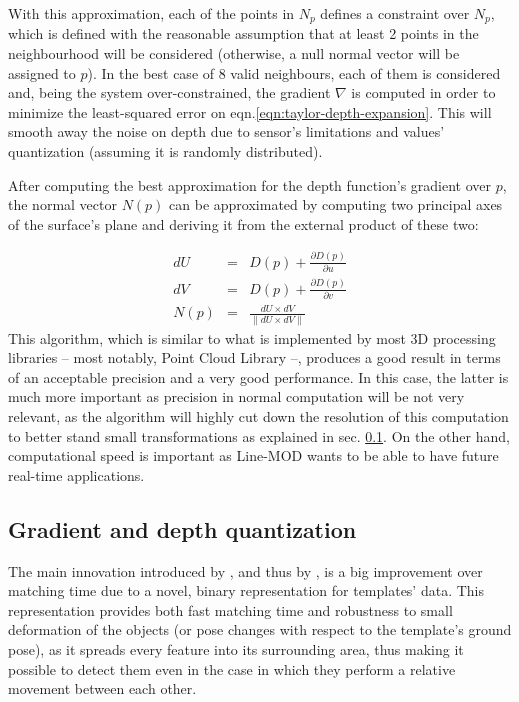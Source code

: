 With this approximation, each of the points in $N_p$ defines a
constraint over $N_p$, which is defined with the reasonable assumption
that at least 2 points in the neighbourhood will be considered
(otherwise, a null normal vector will be assigned to $p$). In the best
case of 8 valid neighbours, each of them is considered and, being the
system over-constrained, the
gradient $\nabla$ is computed in order to minimize the least-squared
error on eqn.\ref{eqn:taylor-depth-expansion}. This will smooth away
the noise on depth due to sensor's limitations and values'
quantization (assuming it is randomly distributed).

After computing the best approximation for the depth function's
gradient over $p$, the normal vector $N(p)$ can be approximated by computing
two principal axes of the surface's plane and deriving it from the
external product of these two:

\begin{eqnarray}
  dU & = & D(p)+\frac{\partial D(p)}{\partial u} \\
  dV & = & D(p)+\frac{\partial D(p)}{\partial v} \\
  N(p) & = & \frac{dU \times dV}{\lVert dU \times dV \rVert}
\end{eqnarray}
This algorithm, which is similar to what is implemented by most 3D
processing libraries -- most notably, Point Cloud Library --, produces
a good result in terms of an acceptable precision and a very good
performance. In this case, the latter is much more important as
precision in normal computation will be not very relevant, as the
algorithm will highly cut down the resolution of this computation to
better stand small transformations as explained in
sec. \ref{sec:linemod-quantization}. On the other hand, computational speed
is important as Line-MOD wants to be able to have future real-time applications.

\subsection{Gradient and depth quantization} \label{sec:linemod-quantization}
The main innovation introduced by \cite{linemod-origins}, and thus by
\cite{linemod-paper}, is a big improvement over matching time due to
a novel, binary representation for templates' data. This
representation provides both fast matching time and robustness to small
deformation of the objects (or pose changes with respect to the
template's ground pose), as it spreads every feature into its surrounding
area, thus making it possible to detect them even in the case in which
they perform a relative movement between each other.

